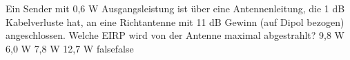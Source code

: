     {Ein Sender mit 0,6 W Ausgangsleistung ist über eine Antennenleitung, die 1 dB Kabelverluste hat, an eine Richtantenne mit 11 dB Gewinn (auf Dipol bezogen) angeschlossen. Welche EIRP wird von der Antenne maximal abgestrahlt?}
    {9,8 W}
    {6,0 W}
    {7,8 W}
    {12,7 W}
    {false}{false}